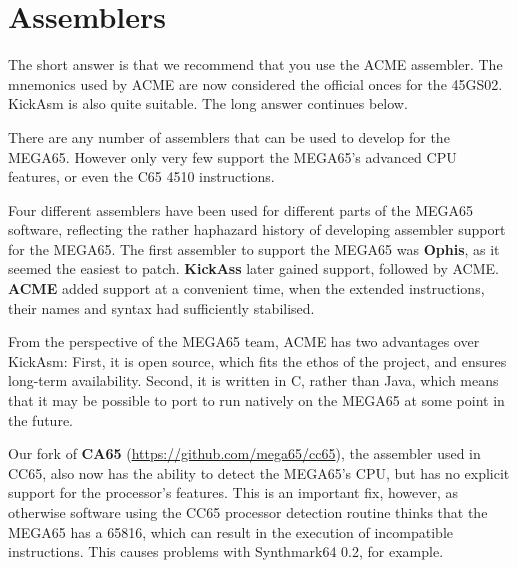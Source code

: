\chapter{Assemblers}

The short answer is that we recommend that you use the ACME
assembler.  The mnemonics used by ACME are now considered the official
onces for the 45GS02.  KickAsm is also quite suitable. The long answer continues below.

There are any number of assemblers that can be used to develop for the
MEGA65.  However only very few support the MEGA65's advanced CPU
features, or even the C65 4510 instructions.

Four different
assemblers have been used for different parts of the MEGA65 software,
reflecting the rather haphazard history of developing assembler
support for the MEGA65.  The first assembler to support the MEGA65 was
{\bf Ophis}, as it seemed the easiest to patch.  {\bf KickAss} later gained
support, followed by ACME. {\bf ACME} added support at a convenient time, when
the extended instructions, their names and syntax had sufficiently stabilised.

From the perspective of the MEGA65 team, ACME has two advantages over KickAsm:
First, it is open source, which fits the ethos of the project, and ensures long-term
availability. Second, it is written in C, rather than Java, which means that
it may be possible to port to run natively on the MEGA65 at some point in
the future.

Our fork of {\bf CA65} (\url{https://github.com/mega65/cc65}), the assembler
used in CC65, also now has the ability 
to detect the MEGA65's CPU, but has no explicit support for the
processor's features.  This is an important fix, however, as otherwise
software using the CC65 processor detection routine thinks that the
MEGA65 has a 65816, which can result in the execution of incompatible
instructions. This causes problems with Synthmark64 0.2, for example.
